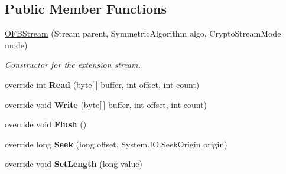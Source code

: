 \subsection*{Public Member Functions}
\begin{DoxyCompactItemize}
\item 
\mbox{\hyperlink{class_b_s_k___encryption_1_1_encryption_1_1_o_f_b_1_1_o_f_b_stream_ad0ce9d5e1753dd3b01fd6c883f7c794a}{O\+F\+B\+Stream}} (Stream parent, Symmetric\+Algorithm algo, Crypto\+Stream\+Mode mode)
\begin{DoxyCompactList}\small\item\em Constructor for the extension stream. \end{DoxyCompactList}\item 
\mbox{\label{class_b_s_k___encryption_1_1_encryption_1_1_o_f_b_1_1_o_f_b_stream_a69241ac77bb1f463519624c31aeae7c4}} 
override int {\bfseries Read} (byte\mbox{[}$\,$\mbox{]} buffer, int offset, int count)
\item 
\mbox{\label{class_b_s_k___encryption_1_1_encryption_1_1_o_f_b_1_1_o_f_b_stream_a696a23586bf7ec0d4a60d98f8078f47d}} 
override void {\bfseries Write} (byte\mbox{[}$\,$\mbox{]} buffer, int offset, int count)
\item 
\mbox{\label{class_b_s_k___encryption_1_1_encryption_1_1_o_f_b_1_1_o_f_b_stream_a69c8c165f3dd34f31c9fe799d5ca0553}} 
override void {\bfseries Flush} ()
\item 
\mbox{\label{class_b_s_k___encryption_1_1_encryption_1_1_o_f_b_1_1_o_f_b_stream_a1ddfc639f68b7da48e6b86922409213b}} 
override long {\bfseries Seek} (long offset, System.\+I\+O.\+Seek\+Origin origin)
\item 
\mbox{\label{class_b_s_k___encryption_1_1_encryption_1_1_o_f_b_1_1_o_f_b_stream_a120e8bfecd3b9bd050088b397e4c3787}} 
override void {\bfseries Set\+Length} (long value)
\end{DoxyCompactItemize}
